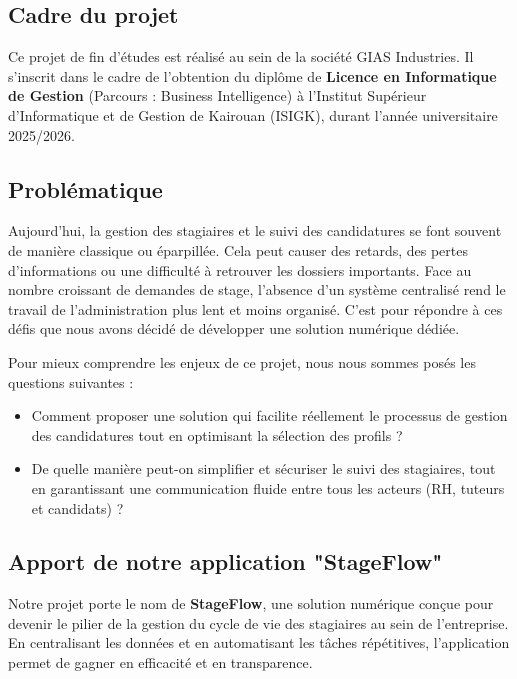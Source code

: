 \subsection{Cadre du projet}
Ce projet de fin d'études est réalisé au sein de la société GIAS Industries. Il s'inscrit dans le cadre de l'obtention du diplôme de \textbf{Licence en Informatique de Gestion} (Parcours : Business Intelligence) à l'Institut Supérieur d'Informatique et de Gestion de Kairouan (ISIGK), durant l'année universitaire 2025/2026.

\subsection{Problématique}
Aujourd'hui, la gestion des stagiaires et le suivi des candidatures se font souvent de manière classique ou éparpillée. Cela peut causer des retards, des pertes d'informations ou une difficulté à retrouver les dossiers importants. Face au nombre croissant de demandes de stage, l'absence d'un système centralisé rend le travail de l'administration plus lent et moins organisé. C'est pour répondre à ces défis que nous avons décidé de développer une solution numérique dédiée.

Pour mieux comprendre les enjeux de ce projet, nous nous sommes posés les questions suivantes :
\begin{itemize}
    \item Comment proposer une solution qui facilite réellement le processus de gestion des candidatures tout en optimisant la sélection des profils ?
    \item De quelle manière peut-on simplifier et sécuriser le suivi des stagiaires, tout en garantissant une communication fluide entre tous les acteurs (RH, tuteurs et candidats) ?
\end{itemize}

\subsection{Apport de notre application "StageFlow"}
Notre projet porte le nom de \textbf{StageFlow}, une solution numérique conçue pour devenir le pilier de la gestion du cycle de vie des stagiaires au sein de l'entreprise. En centralisant les données et en automatisant les tâches répétitives, l'application permet de gagner en efficacité et en transparence.

